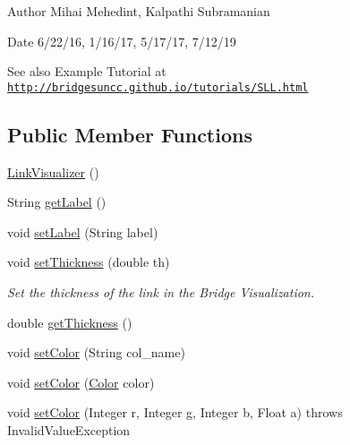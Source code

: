 \begin{DoxyAuthor}{Author}
Mihai Mehedint, Kalpathi Subramanian
\end{DoxyAuthor}
\begin{DoxyDate}{Date}
6/22/16, 1/16/17, 5/17/17, 7/12/19
\end{DoxyDate}
\begin{DoxySeeAlso}{See also}
Example Tutorial at ~\newline
 \href{http://bridgesuncc.github.io/tutorials/SLL.html}{\tt http\+://bridgesuncc.\+github.\+io/tutorials/\+S\+L\+L.\+html} 
\end{DoxySeeAlso}
\subsection*{Public Member Functions}
\begin{DoxyCompactItemize}
\item 
\mbox{\hyperlink{classbridges_1_1base_1_1_link_visualizer_a0b69f099fa264ae9097b0efe278c6a1b}{Link\+Visualizer}} ()
\item 
String \mbox{\hyperlink{classbridges_1_1base_1_1_link_visualizer_a9ed60a0f8a337cd2c98b2d6ab07b8601}{get\+Label}} ()
\item 
void \mbox{\hyperlink{classbridges_1_1base_1_1_link_visualizer_a073d84e04dd95c3848c9f4e0ad74eb77}{set\+Label}} (String label)
\item 
void \mbox{\hyperlink{classbridges_1_1base_1_1_link_visualizer_a702e9ca345d1a4a035baf2041f275849}{set\+Thickness}} (double th)
\begin{DoxyCompactList}\small\item\em Set the thickness of the link in the Bridge Visualization. \end{DoxyCompactList}\item 
double \mbox{\hyperlink{classbridges_1_1base_1_1_link_visualizer_af1592d2a8664b00c1a51fdc0f8d1860a}{get\+Thickness}} ()
\item 
void \mbox{\hyperlink{classbridges_1_1base_1_1_link_visualizer_a92f306dbd73b961befa8ab4c0620a89e}{set\+Color}} (String col\+\_\+name)
\item 
void \mbox{\hyperlink{classbridges_1_1base_1_1_link_visualizer_ab05a7576f99818937276a4937eedeee1}{set\+Color}} (\mbox{\hyperlink{classbridges_1_1base_1_1_color}{Color}} color)
\item 
void \mbox{\hyperlink{classbridges_1_1base_1_1_link_visualizer_a003905cfe33e1704555b2b3a1cf99bad}{set\+Color}} (Integer r, Integer g, Integer b, Float a)  throws Invalid\+Value\+Exception 

\end{DoxyCompactItemize}
